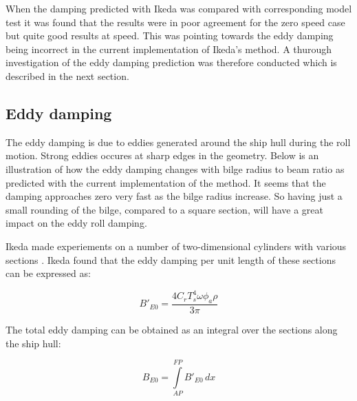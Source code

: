     When the damping predicted with Ikeda was compared with corresponding
model test it was found that the results were in poor agreement for the
zero speed case but quite good results at speed. This was pointing
towards the eddy damping being incorrect in the current implementation
of Ikeda's method. A thurough investigation of the eddy damping
prediction was therefore conducted which is described in the next
section.

    \subsection{Eddy damping}\label{eddy-damping}

The eddy damping is due to eddies generated around the ship hull during
the roll motion. Strong eddies occures at sharp edges in the geometry.
Below is an illustration of how the eddy damping changes with bilge
radius to beam ratio as predicted with the current implementation of the
method. It seems that the damping approaches zero very fast as the bilge
radius increase. So having just a small rounding of the bilge, compared
to a square section, will have a great impact on the eddy roll damping.

    \begin{figure}
        \begin{center}\end{center}
        \caption{}
        \label{fig:}
    \end{figure}
    
    Ikeda made experiements on a number of two-dimensional cylinders with
various sections \cite{7505983/4AFVVGNT}. Ikeda found that the eddy
damping per unit length of these sections can be expressed as:
 
            
    
    \begin{equation}
B'_{E0} = \frac{4 C_{r} T_{s}^{4} \omega \phi_{a} \rho}{3 \pi}
\label{eq:equation}
\end{equation}

    

    The total eddy damping can be obtained as an integral over the sections
along the ship hull:
 
            
    
    \begin{equation}
B_{E0} = \int\limits_{AP}^{FP} B'_{E0}\, dx
\label{eq:equation}
\end{equation}

